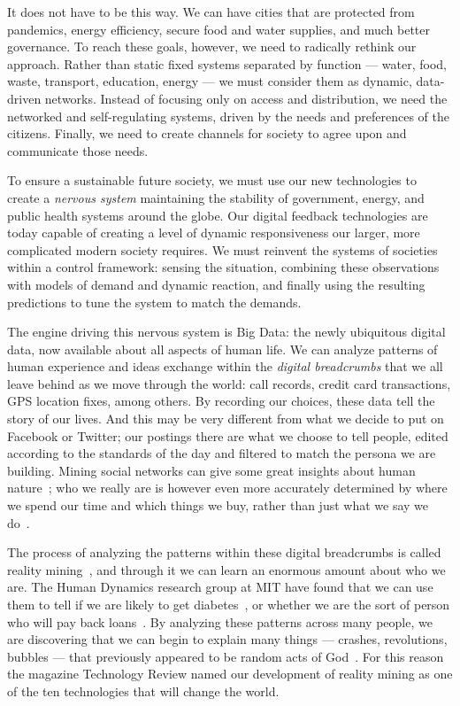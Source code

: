 It does not have to be this way.
We can have cities that are protected from pandemics, energy efficiency, secure food and water supplies, and much better governance.
To reach these goals, however, we need to radically rethink our approach.
Rather than static fixed systems separated by function --- water, food, waste, transport, education, energy --- we must consider them as dynamic, data-driven networks.
Instead of focusing only on access and distribution, we need the networked and self-regulating systems, driven by the needs and preferences of the citizens.
Finally, we need to create channels for society to agree upon and communicate those needs. 

To ensure a sustainable future society, we must use our new technologies to create a \emph{nervous system} maintaining the stability of government, energy, and public health systems around the globe.
Our digital feedback technologies are today capable of creating a level of dynamic responsiveness our larger, more complicated modern society requires.
We must reinvent the systems of societies within a control framework: sensing the situation, combining these observations with models of demand and dynamic reaction, and finally using the resulting predictions to tune the system to match the demands.

The engine driving this nervous system is Big Data: the newly ubiquitous digital data, now available about all aspects of human life.
We can analyze patterns of human experience and ideas exchange within the \emph{digital breadcrumbs} that we all leave behind as we move through the world: call records, credit card transactions, GPS location fixes, among others.
By recording our choices, these data tell the story of our lives.
And this may be very different from what we decide to put on Facebook or Twitter; our postings there are what we choose to tell people, edited according to the standards of the day and filtered to match the persona we are building.
Mining social networks can give some great insights about human nature~\cite{aral2012identifying,mislove2010pulse, vitak2011s}; who we really are is however even more accurately determined by where we spend our time and which things we buy, rather than just what we say we do~\cite{madrigal2013dark}.

The process of analyzing the patterns within these digital breadcrumbs is called reality mining~\cite{eagle2006reality,pentland2009reality}, and through it we can learn an enormous amount about who we are.
The Human Dynamics research group at MIT have found that we can use them to tell if we are likely to get diabetes~\cite{pentland2009using}, or whether we are the sort of person who will pay back loans~\cite{singh2013classifying}.
By analyzing these patterns across many people, we are discovering that we can begin to explain many things --- crashes, revolutions, bubbles --- that previously appeared to be random acts of God~\cite{pan2012decoding}.
For this reason the magazine Technology Review named our development of reality mining as one of the ten technologies that will change the world\cite{greene2008reality}. 

